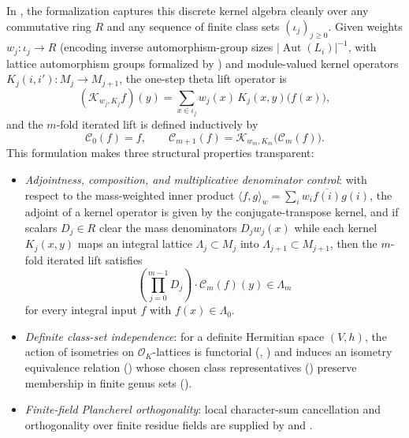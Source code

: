 In , the formalization
captures this discrete kernel algebra cleanly over any commutative ring $R$
and any sequence of finite class sets $(\iota_j)_{j \ge 0}$.
Given weights $w_j : \iota_j \to R$ (encoding inverse automorphism-group sizes
$|\operatorname{Aut}(L_i)|^{-1}$, with lattice automorphism groups formalized
by ) and module-valued kernel
operators $K_j(i, i') : M_j \to M_{j+1}$, the one-step theta lift operator
 is
\[
  (\mathcal{K}_{w_j, K_j} f)(y) = \sum_{x \in \iota_j} w_j(x)\, K_j(x, y)\bigl(f(x)\bigr),
\]
and the $m$-fold iterated lift 
is defined inductively by
\[
  \mathcal{C}_0(f) = f,
  \qquad
  \mathcal{C}_{m+1}(f) = \mathcal{K}_{w_m, K_m}\!\bigl(\mathcal{C}_m(f)\bigr).
\]
This formulation makes three structural properties transparent:
\begin{itemize}
  \item \emph{Adjointness, composition, and multiplicative denominator control}:
        with respect to the mass-weighted inner product
        $\langle f, g \rangle_w = \sum_i w_i \overline{f(i)} g(i)$, the adjoint
        of a kernel operator is given by the conjugate-transpose kernel, and
        if scalars $D_j \in R$ clear the mass denominators $D_j w_j(x)$ while
        each kernel $K_j(x, y)$ maps an integral lattice $\Lambda_j \subset M_j$
        into $\Lambda_{j+1} \subset M_{j+1}$, then the $m$-fold iterated lift
        satisfies
        \[
          \left(\prod_{j=0}^{m-1} D_j\right) \cdot \mathcal{C}_m(f)(y) \in \Lambda_m
        \]
        for every integral input $f$ with $f(x) \in \Lambda_0$.
  \item \emph{Definite class-set independence}: for a definite Hermitian space
        $(V, h)$, the action of isometries on $\mathcal{O}_K$-lattices is
        functorial (,
        )
        and induces an isometry equivalence relation
        ()
        whose chosen class representatives
        ()
        preserve membership in finite genus sets
        ().
  \item \emph{Finite-field Plancherel orthogonality}: local character-sum
        cancellation and orthogonality over finite residue fields are supplied
        by 
        and .
\end{itemize}

